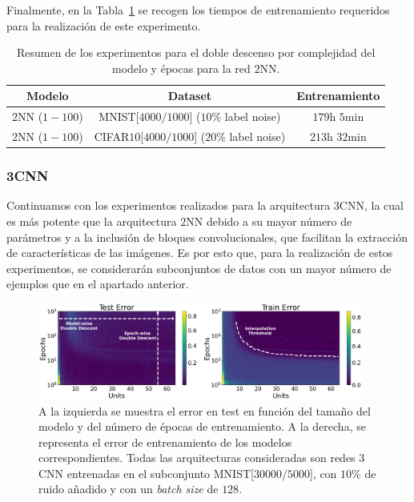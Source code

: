 Finalmente, en la Tabla~\ref{tab:2nn_model-epochwise} se recogen los tiempos de entrenamiento requeridos para la realización de este experimento.

\begin{table}[h!]
    \centering
    \begin{tabular}{|c|c|c|}
    \hline
    \textbf{Modelo}       & \textbf{Dataset} & \textbf{Entrenamiento} \\ 
    \hline
    $2$NN ($1-100$)      & MNIST[$4000/1000$] ($10$\% label noise)        & $179$h $5$min \\ 
    $2$NN ($1-100$)      & CIFAR$10$[$4000/1000$]  ($20$\% label noise)   & $213$h $32$min \\
    \hline
    \end{tabular}
    \caption[Resumen de los experimentos para el doble descenso por complejidad del modelo y épocas para la red $2$NN.]{Resumen de los experimentos para el doble descenso por complejidad del modelo y épocas para la red $2$NN.}\label{tab:2nn_model-epochwise}
\end{table}

\subsubsection{3CNN}\label{subsubsec:model-epoch-wise-3CNN}

Continuamos con los experimentos realizados para la arquitectura $3$CNN, la cual es más potente que la arquitectura $2$NN debido a su mayor número de parámetros y a la inclusión de bloques convolucionales, que facilitan la extracción de características de las imágenes. Es por esto que, para la realización de estos experimentos, se considerarán subconjuntos de datos con un mayor número de ejemplos que en el apartado anterior.

\begin{figure}[h]
    \centering
    \includegraphics[width=0.95\textwidth]{img/experiments/model-epoch3CNNMNIST30k.png}
    \caption[Doble descenso en función del tamaño del modelo y del número de épocas para la red $3$CNN y un subconjunto de MNIST.]{A la izquierda se muestra el error en test en función del tamaño del modelo y del número de épocas de entrenamiento. A la derecha, se representa el error de entrenamiento de los modelos correspondientes. Todas las arquitecturas consideradas son redes $3$CNN entrenadas en el subconjunto MNIST[$30000/5000$], con $10\%$ de ruido añadido y con un \textit{batch size} de $128$.}\label{fig:model-epoch3CNNMNIST30k}
\end{figure}

